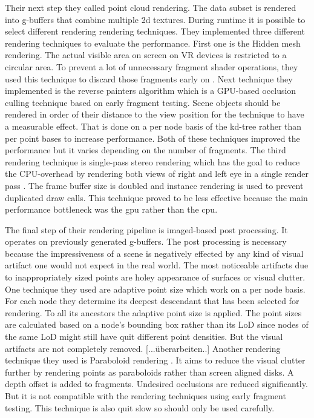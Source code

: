 \documentclass[10pt,twocolumn,letterpaper]{article}
\begin{document}
\setlength{\parindent}{1pc}Their next step they called point cloud rendering. The data subset is rendered into g-buffers that combine multiple 2d textures. During runtime it is possible to select different rendering rendering techniques. They implemented three different rendering techniques to evaluate the performance. First one is the Hidden mesh rendering. The actual visible area on screen on VR devices is restricted to a circular area. To prevent a lot of unnecessary fragment shader operations, they used this technique to discard those fragments early on \cite{vlachos_advanced_2015}. Next technique they implemented is the reverse painters algorithm \cite{foley1996computer} which is a GPU-based occlusion culling technique based on early fragment testing. Scene objects should be rendered in order of their distance to the view position for the technique to have a measurable effect. That is done on a per node basis of the kd-tree rather than per point bases to increase performance. Both of these techniques improved the performance but it varies depending on the number of fragments.
The third rendering technique is single-pass stereo rendering which has the goal to reduce the CPU-overhead by rendering both views of right and left eye in a single render pass \cite{johansson2016efficient}. The frame buffer size is doubled and instance rendering is used to prevent duplicated draw calls. This technique proved to be less effective because the main performance bottleneck was the gpu rather than the cpu.


\setlength{\parindent}{1pc}The final step of their rendering pipeline is imaged-based post processing. It operates on previously generated g-buffers. The post processing is necessary because the impressiveness of a scene is negatively effected by any kind of visual artifact one would not expect in the real world. The most noticeable artifacts due to inappropriately sized points are holey appearance of surfaces or visual clutter. One technique they used are adaptive point size which work on a per node basis. For each node they determine its deepest descendant that has been selected for rendering. To all its ancestors the adaptive point size is applied. The point sizes are calculated based on a node’s bounding box rather than its LoD since nodes of the same LoD might still have quit different point densities. But the visual artifacts are not completely removed. [...überarbeiten..]
Another rendering technique they used is Paraboloid rendering \cite{schutz2016potree}. It aims to reduce the visual clutter further by rendering points as paraboloids rather than screen aligned disks. A depth offset is added to fragments. Undesired occlusions are reduced significantly. But it is not compatible with the rendering techniques using early fragment testing. This technique is also quit slow so should only be used carefully.
\end{document}

